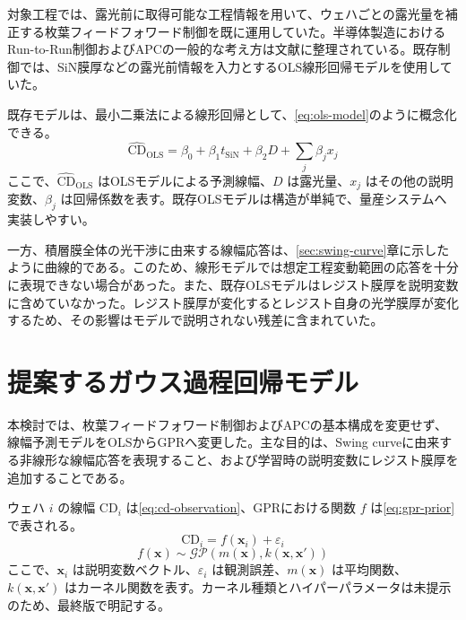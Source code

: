 \documentclass[11pt,a4paper]{ltjsarticle}
\newcommand{\CD}{\mathrm{CD}}
\begin{document}
対象工程では、露光前に取得可能な工程情報を用いて、ウェハごとの露光量を補正する枚葉フィードフォワード制御を既に運用していた。半導体製造におけるRun-to-Run制御およびAPCの一般的な考え方は文献\cite{moyne2001}に整理されている。既存制御では、SiN膜厚などの露光前情報を入力とするOLS線形回帰モデルを使用していた。

既存モデルは、最小二乗法による線形回帰\cite{draper1998}として、\cref{eq:ols-model}のように概念化できる。
\begin{equation}
  \widehat{\CD}_{\mathrm{OLS}}
  =\beta_0+\beta_1t_{\mathrm{SiN}}+\beta_2D+\sum_j\beta_jx_j
  \label{eq:ols-model}
\end{equation}
ここで、$\widehat{\CD}_{\mathrm{OLS}}$ はOLSモデルによる予測線幅、$D$ は露光量、$x_j$ はその他の説明変数、$\beta_j$ は回帰係数を表す。既存OLSモデルは構造が単純で、量産システムへ実装しやすい。

一方、積層膜全体の光干渉に由来する線幅応答は、\ref{sec:swing-curve}章に示したように曲線的である。このため、線形モデルでは想定工程変動範囲の応答を十分に表現できない場合があった。また、既存OLSモデルはレジスト膜厚を説明変数に含めていなかった。レジスト膜厚が変化するとレジスト自身の光学膜厚が変化するため、その影響はモデルで説明されない残差に含まれていた。


\section{提案するガウス過程回帰モデル}
\label{sec:gpr-model}

本検討では、枚葉フィードフォワード制御およびAPCの基本構成を変更せず、線幅予測モデルをOLSからGPRへ変更した。主な目的は、Swing curveに由来する非線形な線幅応答を表現すること、および学習時の説明変数にレジスト膜厚を追加することである。

ウェハ $i$ の線幅 $\CD_i$ は\cref{eq:cd-observation}、GPRにおける関数 $f$ は\cref{eq:gpr-prior}で表される\cite{rasmussen2006}。
\begin{equation}
  \CD_i=f(\bm{x}_i)+\varepsilon_i
  \label{eq:cd-observation}
\end{equation}
\begin{equation}
  f(\bm{x})\sim
  \mathcal{GP}\!\left(m(\bm{x}),k(\bm{x},\bm{x}')\right)
  \label{eq:gpr-prior}
\end{equation}
ここで、$\bm{x}_i$ は説明変数ベクトル、$\varepsilon_i$ は観測誤差、$m(\bm{x})$ は平均関数、$k(\bm{x},\bm{x}')$ はカーネル関数を表す。カーネル種類とハイパーパラメータは未提示のため、最終版で明記する。
\end{document}
